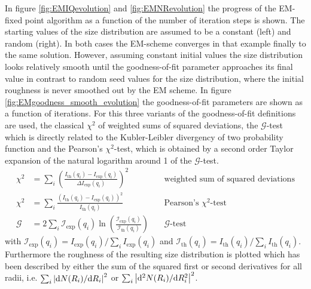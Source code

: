 In figure \ref{fig:EMIQevolution} and \ref{fig:EMNRevolution} the progress of the EM-fixed point algorithm as a function of the number of iteration steps is shown. The starting values of the size distribution are assumed to be a constant (left) and random (right). In both cases the EM-scheme converges in that example finally to the same solution. However, assuming constant initial values the size distribution looks relatively smooth until the goodness-of-fit parameter approaches its final value in contrast to random seed values for the size distribution, where the initial roughness is never smoothed out by the EM scheme. In figure \ref{fig:EMgoodness_smooth_evolution} the goodness-of-fit parameters are shown as a function of iterations. For this three variants of the goodness-of-fit definitions are used, the classical $\chi^2$ of weighted sums of squared  deviations, the $\mathcal{G}$-test which is directly related to the Kubler-Leibler divergency of two probability function and the Pearson's $\chi^2$-test, which is obtained by a second order Taylor expansion of the natural logarithm around 1 of the  $\mathcal{G}$-test.
\begin{align}
  \chi^2 &= \sum_i \left(\frac{I_\mathrm{th}(q_i)-I_\mathrm{exp}(q_i)}{\Delta I_\mathrm{exp}(q_i)}\right)^2 &~ &\mbox{weighted sum of squared  deviations} \label{eq:goodnessoffit_chi2}\\
  \chi^2 &= \sum_i \frac{\left(I_\mathrm{th}(q_i)-I_\mathrm{exp}(q_i)\right)^2}{I_\mathrm{th}(q_i)} &~ &\mbox{Pearson's $\chi^2$-test} \label{eq:goodnessoffit_chi2test}\\
  \mathcal{G} &= 2\sum_i \mathcal{I}_\mathrm{exp}(q_i)\ln\left(\frac{\mathcal{I}_\mathrm{exp}(q_i)}{\mathcal{I}_\mathrm{th}(q_i)}\right) &~ & \mathcal{G}\mbox{-test} \label{eq:goodnessoffit_Gtest}
\end{align}
with $\mathcal{I}_\mathrm{exp}(q_i)=I_\mathrm{exp}(q_i)/\sum_i I_\mathrm{exp}(q_i)$ and $\mathcal{I}_\mathrm{th}(q_i)=I_\mathrm{th}(q_i)/\sum_i I_\mathrm{th}(q_i)$.
Furthermore the roughness of the resulting size distribution is plotted which has been described by either the sum of the squared first or second derivatives for all radii, i.e. $\sum_i \abs{\mathrm{d}N(R_i)/\mathrm{d}R_i}^2$ or $\sum_i \abs{\mathrm{d}^2N(R_i)/\mathrm{d}R_i^2}^2$.
